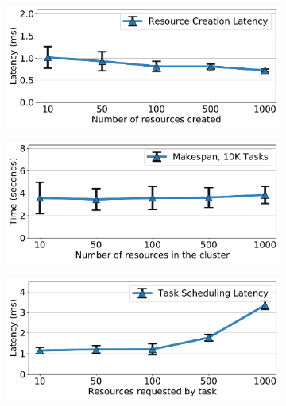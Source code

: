 \begin{figure}[t]
\centering
\begin{subfigure}[b]{0.31\linewidth}
  \centering
  \includegraphics[width=\textwidth]{escher/plots/microbench_horz/result_microbench_creationlatency_vs_numres_horz.pdf}
  \caption{}
  \label{fig:res-creation-microbench}
\end{subfigure}
\begin{subfigure}[b]{0.31\textwidth}
  \centering
  \includegraphics[width=\textwidth]{escher/plots/microbench_horz/result_microbench_schedlatency_vs_clusterresources_horz.pdf}
  \caption{}
  \label{fig:schedlatency-resources-microbench}
\end{subfigure}
\begin{subfigure}[b]{0.31\textwidth}
  \centering
  \includegraphics[width=\textwidth]{escher/plots/microbench_horz/result_microbench_schedlatency_vs_resrequested_horz.pdf}

\end{subfigure}
\end{figure}
